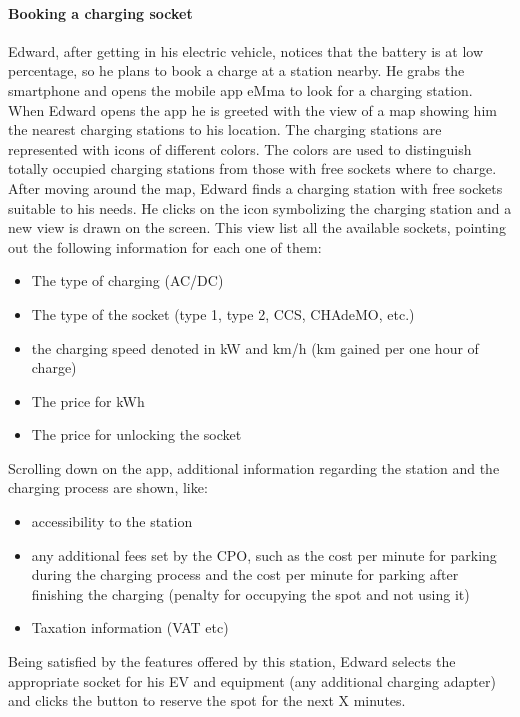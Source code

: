 \paragraph{Booking a charging socket}
Edward, after getting in his electric vehicle, notices that the battery is at low percentage, so he plans to book a charge at a station nearby. He grabs the smartphone and opens the mobile app eMma to look for a charging station. When Edward opens the app he is greeted with the view of a map showing him the nearest charging stations to his location. The charging stations are represented with icons of different colors. The colors are used to distinguish totally occupied charging stations from those with free sockets where to charge. After moving around the map, Edward finds a charging station with free sockets suitable to his needs. He clicks on the icon symbolizing the charging station and a new view is drawn on the screen. This view list all the available sockets, pointing out the following information for each one of them:
\begin{itemize}
    \item The type of charging (AC/DC)
    \item The type of the socket (type 1, type 2, CCS, CHAdeMO, etc.)
    \item the charging speed denoted in kW and km/h (km gained per one hour of charge)
    \item The price for kWh
    \item The price for unlocking the socket
\end{itemize}
Scrolling down on the app, additional information regarding the station and the charging process are shown, like:
\begin{itemize}
    \item accessibility to the station
    \item any additional fees set by the CPO, such as the cost per minute for parking during the charging process and the cost per minute for parking after finishing the charging (penalty for occupying the spot and not using it)
    \item Taxation information (VAT etc)
\end{itemize}
Being satisfied by the features offered by this station, Edward selects the appropriate socket for his EV and equipment (any additional charging adapter) and clicks the button to reserve the spot for the next X minutes.


